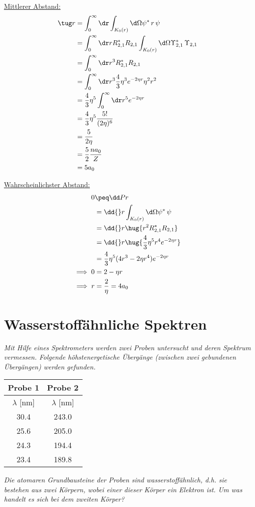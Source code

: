 \documentclass[ex,minted]{exercise_4.0}
\begin{document}
\dottedlinett

\underline{Mittlerer Abstand:}
\begin{align*}
    \tug r &= \int_0^\infty\dr \int_{K_0(r)}\d\Omega \psi^*\, r\, \psi\\
    &= \int_0^\infty\dr r R_{2,1}^* R_{2,1}\int_{K_0(r)}\d\Omega \Upsilon^*_{2,1}\, \Upsilon_{2,1}\\
    &= \int_0^\infty\dr r^3 R^*_{2,1} R _{2,1}\\
    &= \int_0^\infty\dr r^3 \frac{4}{3} \eta^{3} e^{-2 \eta r}\eta^2 r^2 \\
    &= \frac{4}{3} \eta^{5} \int_0^\infty\dr r^5 e^{-2 \eta r} \\
    &= \frac{4}{3} \eta^{5} \frac{5!}{(2\eta)^6} \\
    &= \frac{5}{2\eta} \\
    &= \frac52 \frac{n a_0}{Z}\\
    &= 5 a_0\\
\end{align*}

\underline{Wahrscheinlichster Abstand:}
\begin{align*}
    0 &\peq \dd Pr\\
    &= \dd{}r\int_{K_0(r)}\d\Omega \psi^*\,  \psi\\
    &= \dd{}r\hug{r^2 R^*_{2,1} R _{2,1}}\\
    &= \dd{}r\hug{\frac{4}{3} \eta^{5} r^4e^{-2 \eta r}}\\
    &= \frac{4}{3} \eta^{5} (4r^3 - 2\eta r^4) e^{-2 \eta r}\\
    \implies 0 &= 2 - \eta r\\
    \implies r &= \frac{2}{\eta} = 4 a_0
\end{align*}


\section{Wasserstoffähnliche Spektren}
{\it
    Mit Hilfe eines Spektrometers werden zwei Proben untersucht und deren Spektrum vermessen. Folgende höhstenergetische Übergänge (zwischen zwei gebundenen Übergängen) werden gefunden.
}
\begin{center}
\begin{tabular}{|c|c|}
    \hline
    Probe 1 & Probe 2\\\hline
    \(\lambda\) [nm] &\(\lambda\) [nm] \\\hline
    30.4 & 243.0\\\hline
    25.6 & 205.0\\\hline
    24.3 & 194.4\\\hline
    23.4 & 189.8\\\hline
\end{tabular} 
\end{center}
{\it
Die atomaren Grundbausteine der Proben sind wasserstoffähnlich, d.h. sie bestehen aus zwei Körpern, wobei einer dieser Körper ein Elektron ist. Um was handelt es sich bei dem zweiten Körper?
}
\end{document}
